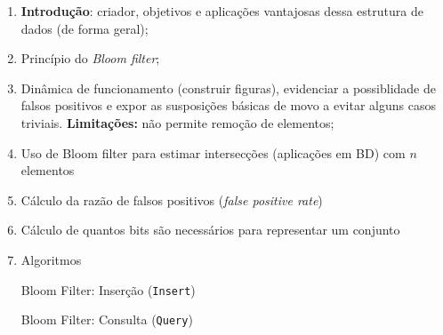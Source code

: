 \documentclass[12pt,twoside,english,brazilian]{article}
\begin{document}
\begin{enumerate}
    \item  \textbf{Introdução}: criador, objetivos e aplicações vantajosas dessa estrutura de dados (de forma geral);
    \item Princípio do \textit{Bloom filter};
    \item Dinâmica de funcionamento (construir figuras), evidenciar a possiblidade de falsos positivos e expor as susposições básicas de movo a evitar alguns casos triviais. \textbf{Limitações:} não permite remoção de elementos;
    \item Uso de Bloom filter para estimar intersecções (aplicações em BD)
     com $n$ elementos
    \item Cálculo da razão de falsos positivos (\textit{false positive rate})
    \item Cálculo de quantos bits são necessários para representar um conjunto
    \item Algoritmos

    \begin{algorithm}
        \caption{Bloom Filter: Inserção (\texttt{Insert})}\label{alg:cap}

    \end{algorithm}

    \begin{algorithm}
        \caption{Bloom Filter: Consulta (\texttt{Query})}\label{alg:cap}

    \end{algorithm}
   
    \begin{enumerate}
    

\end{enumerate}
\end{enumerate}
\end{document}
